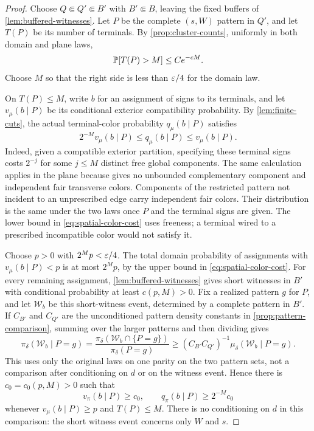 \begin{proof}
Choose $Q\Subset Q'\Subset B'$ with
$B'\Subset B$, leaving the fixed buffers of
\cref{lem:buffered-witnesses}. Let $P$ be the complete $(s,W)$ pattern
in $Q'$, and let $T(P)$ be its number of terminals. By
\cref{prop:cluster-counts}, uniformly in both domain and plane laws,
\begin{equation}\label{eq:spatial-terminal-tail}
                       \P[T(P)>M]\le C e^{-cM}.
\end{equation}
Choose $M$ so that the right side is less than $\eps/4$ for the
domain law.

On $T(P)\le M$, write $b$ for an assignment of signs to its
terminals, and let $v_\mu(b\mid P)$ be its conditional exterior
compatibility probability. By \cref{lem:finite-cuts}, the actual
terminal-color probability $q_\mu(b\mid P)$ satisfies
\begin{equation}\label{eq:spatial-color-cost}
        2^{-M}v_\mu(b\mid P)
             \le q_\mu(b\mid P)\le v_\mu(b\mid P).
\end{equation}
Indeed, given a compatible exterior partition, specifying these
terminal signs costs $2^{-j}$ for some $j\le M$ distinct free global
components. The same calculation applies in the plane because
\cite[Theorem~17.1]{DKLM2026} gives no unbounded complementary
component and independent fair transverse colors. Components of
the restricted pattern not incident to an unprescribed edge carry
independent fair colors. Their distribution is the same under the
two laws once $P$ and the terminal signs are given. The lower
bound in \eqref{eq:spatial-color-cost} uses freeness; a terminal
wired to a prescribed incompatible color would not satisfy it.

Choose $p>0$ with $2^M p<\eps/4$. The total domain probability of
assignments with $v_\mu(b\mid P)<p$ is at most $2^M p$, by the
upper bound in \eqref{eq:spatial-color-cost}. For every remaining
assignment, \cref{lem:buffered-witnesses} gives short witnesses in
$B'$ with conditional probability at least $c(p,M)>0$.
Fix a realized pattern $g$ for $P$, and let $\mathcal W_b$ be this
short-witness event, determined by a
complete pattern in $B'$. If $C_{B'}$ and $C_{Q'}$ are the
unconditioned pattern density constants in
\cref{prop:pattern-comparison}, summing over the larger patterns
and then dividing gives
\[
 \pi_\delta(\mathcal W_b\mid P=g)
   =\frac{\pi_\delta(\mathcal W_b\cap\{P=g\})}{\pi_\delta(P=g)}
   \ge (C_{B'}C_{Q'})^{-1}
          \mu_\delta(\mathcal W_b\mid P=g).
\]
This uses only the original laws on one parity on the two pattern
sets, not a comparison after conditioning on $d$ or on the
witness event. Hence there is $c_0=c_0(p,M)>0$ such that
\begin{equation}\label{eq:spatial-plane-viability}
 v_\pi(b\mid P)\ge c_0,
 \qquad q_\pi(b\mid P)\ge 2^{-M}c_0
\end{equation}
whenever $v_\mu(b\mid P)\ge p$ and $T(P)\le M$.
There is no conditioning on $d$ in this comparison: the short
witness event concerns only $W$ and $s$.


\end{proof}
